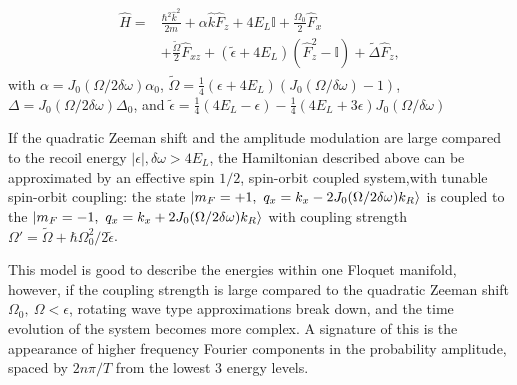 \begin{align}
	\begin{split}
		\hat{H} = &\frac{\hbar^2\hat{k}^2}{2m} + \alpha\hat{k}\hat{F}_z +4E_L\mathbb{I} + \frac{\Omega_0}{2}\hat{F}_x \\
		&+ \frac{\tilde{\Omega}}{2}\hat{F}_{xz} +(\tilde{\epsilon}+4E_L)(\hat{F}_z^2-\mathbb{I}) +\tilde{\Delta}\hat{F}_z, 
		\label{Eq:SOCeff}
	\end{split}
\end{align}	
%
with $\alpha= J_0(\Omega/2\delta\omega)\alpha_0$, $\tilde{\Omega}=\frac{1}{4}(\epsilon+4E_L) (J_0(\Omega/\delta\omega)-1)$, $\Delta=J_0(\Omega/2\delta\omega)\Delta_0$, and $\tilde{\epsilon}= \frac{1}{4}(4E_L-\epsilon) - 
\frac{1}{4}(4E_L + 3 \epsilon) J_0( \Omega/\delta\omega)$

If the quadratic Zeeman shift and the amplitude modulation are large compared to the recoil energy $|\epsilon|, \delta\omega >4E_L$, the Hamiltonian described above can be approximated by an effective spin $1/2$, spin-orbit coupled system,with tunable spin-orbit coupling: the state $\ket{m_F=+1,\ q_x=k_x-2J_0(\Omega/2\delta\omega)k_R}$ is coupled to the $\ket{m_F=-1,\ q_x=k_x+2J_0(\Omega/2\delta\omega)k_R}$ with coupling strength  $\Omega'=\tilde{\Omega}+\hbar\Omega_0^2/2\tilde{\epsilon}$.

This model is good to describe the energies within one Floquet manifold, however, if the coupling strength is large compared to the quadratic Zeeman shift $\Omega_0,\ \Omega<\epsilon$, rotating wave type approximations break down, and the time evolution of the system becomes more complex. A signature of this is the appearance of higher frequency Fourier components in the probability amplitude, spaced by $2n\pi/T$ from the lowest 3 energy levels. 
 











